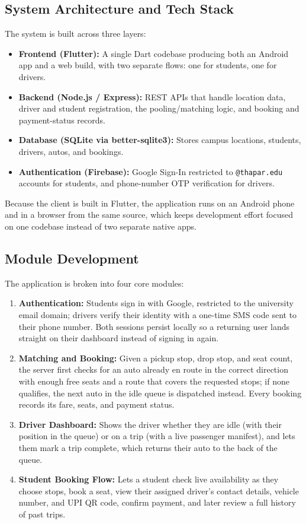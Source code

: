 \documentclass[11pt]{article}
\begin{document}
\subsection{System Architecture and Tech Stack}
The system is built across three layers:
\begin{itemize}[leftmargin=1.4em, itemsep=0.2em]
  \item \textbf{Frontend (Flutter):} A single Dart codebase producing both an Android app and a web build, with two separate flows: one for students, one for drivers.
  \item \textbf{Backend (Node.js / Express):} REST APIs that handle location data, driver and student registration, the pooling/matching logic, and booking and payment-status records.
  \item \textbf{Database (SQLite via better-sqlite3):} Stores campus locations, students, drivers, autos, and bookings.
  \item \textbf{Authentication (Firebase):} Google Sign-In restricted to \texttt{@thapar.edu} accounts for students, and phone-number OTP verification for drivers.
\end{itemize}
Because the client is built in Flutter, the application runs on an Android phone and in a browser from the same source, which keeps development effort focused on one codebase instead of two separate native apps.

\subsection{Module Development}
The application is broken into four core modules:
\begin{enumerate}[leftmargin=1.4em, itemsep=0.2em]
  \item \textbf{Authentication:} Students sign in with Google, restricted to the university email domain; drivers verify their identity with a one-time SMS code sent to their phone number. Both sessions persist locally so a returning user lands straight on their dashboard instead of signing in again.
  \item \textbf{Matching and Booking:} Given a pickup stop, drop stop, and seat count, the server first checks for an auto already en route in the correct direction with enough free seats and a route that covers the requested stops; if none qualifies, the next auto in the idle queue is dispatched instead. Every booking records its fare, seats, and payment status.
  \item \textbf{Driver Dashboard:} Shows the driver whether they are idle (with their position in the queue) or on a trip (with a live passenger manifest), and lets them mark a trip complete, which returns their auto to the back of the queue.
  \item \textbf{Student Booking Flow:} Lets a student check live availability as they choose stops, book a seat, view their assigned driver's contact details, vehicle number, and UPI QR code, confirm payment, and later review a full history of past trips.
\end{enumerate}
\end{document}
